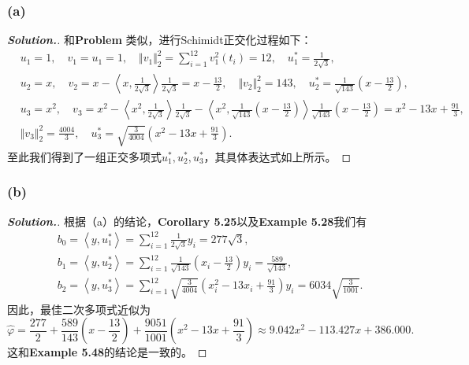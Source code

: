 \documentclass{ctexart}
\begin{document}
\begin{sloppypar}
\subsubsection*{(a)}
\begin{proof}[\textbf{Solution.}]
和\textbf{Problem \uppercase\expandafter{}}类似，进行Schimidt正交化过程如下：
\begin{equation}
    \begin{split}
        &u_1=1,\quad v_1 = u_1 = 1,\quad \Vert v_1 \Vert_2^2 = \sum_{i=1}^{12} v_1^2(t_i) = 12, \quad u_1^* = \frac{1}{2\sqrt{3}}, \\
        &u_2=x,\quad v_2 = x - \left \langle x,\frac{1}{2\sqrt{3}}\right \rangle\frac{1}{2\sqrt{3}} = x-\frac{13}{2},\quad \Vert v_2 \Vert_2^2 = 143  , \quad u_2^* = \frac{1}{\sqrt{143}}\left(x-\frac{13}{2}\right), \\
        &u_3=x^2,\quad v_3 = x^2 - \left \langle x^2,\frac{1}{2\sqrt{3}} \right \rangle\frac{1}{2\sqrt{3}} -  \left \langle x^2,\frac{1}{\sqrt{143}}\left(x-\frac{13}{2}\right) \right \rangle\frac{1}{\sqrt{143}}\left(x-\frac{13}{2}\right) = x^2 - 13x+\frac{91}{3}, \\
        &\Vert v_3 \Vert_2^2 = \frac{4004}{3}  , \quad u_3^* = \sqrt{\frac{3}{4004}}\left(x^2 - 13x+\frac{91}{3}\right).
    \end{split}
\end{equation}
至此我们得到了一组正交多项式$u_1^*,u_2^*,u_3^*$，其具体表达式如上所示。
\end{proof}
\subsubsection*{(b)}
\begin{proof}[\textbf{Solution.}]
根据（a）的结论，\textbf{Corollary 5.25}以及\textbf{Example 5.28}我们有
\begin{equation}
    \begin{split}
        &b_0 = \left \langle y,u_1^* \right \rangle = \sum_{i=1}^{12} \frac{1}{2\sqrt{3}}y_i = 277\sqrt{3} , \\
        &b_1 = \left \langle y,u_2^* \right \rangle = \sum_{i=1}^{12} \frac{1}{\sqrt{143}}\left(x_i-\frac{13}{2}\right)y_i = \frac{589}{\sqrt{143}}, \\
        &b_2 = \left \langle y,u_3^* \right \rangle = \sum_{i=1}^{12} \sqrt{\frac{3}{4004}}\left(x_i^2 - 13x_i+\frac{91}{3}\right)y_i = 6034\sqrt{\frac{3}{1001}}.
    \end{split}
\end{equation}
因此，最佳二次多项式近似为
\begin{equation}
    \hat{\varphi} =\frac{277}{2} + \frac{589}{143}\left(x-\frac{13}{2}\right) + \frac{9051}{1001}\left(x^2 - 13x+\frac{91}{3}\right) \approx 9.042x^2 -113.427x + 386.000.
\end{equation}
这和\textbf{Example 5.48}的结论是一致的。
\end{proof}

\end{sloppypar}
\end{document}
